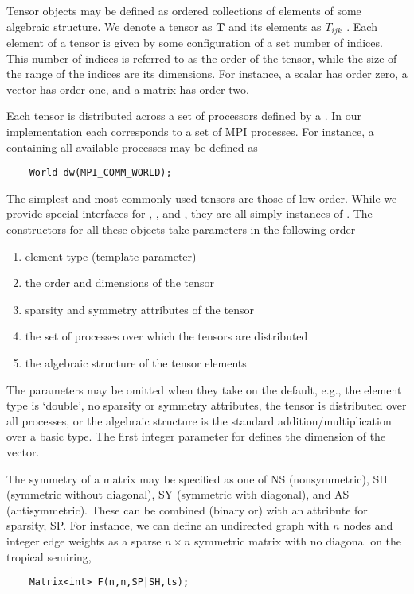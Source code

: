 Tensor objects may be defined as ordered collections of elements of some algebraic structure.
We denote a tensor as $\mathbf{T}$ and its elements as $T_{ijk..}$.
Each element of a tensor is given by some configuration of a set number of indices.
This number of indices is referred to as the order of the tensor, while the size of the range of the indices are its dimensions.
For instance, a scalar has order zero, a vector has order one, and a matrix has order two.

Each tensor is distributed across a set of processors defined by a {}.
In our implementation each {} corresponds to a set of MPI processes.
For instance, a {} containing all available processes may be defined as
\begin{lstlisting}
    World dw(MPI_COMM_WORLD);
\end{lstlisting}





The simplest and most commonly used tensors are those of low order.
While we provide special interfaces for {}, {}, and {}, they are all simply instances of {}.
The constructors for all these objects take parameters in the following order
\begin{enumerate}
\item element type (template parameter)
\item the order and dimensions of the tensor
\item sparsity and symmetry attributes of the tensor
\item the set of processes over which the tensors are distributed
\item the algebraic structure of the tensor elements
\end{enumerate}
The parameters may be omitted when they take on the default, e.g., the element type is `double', no sparsity or symmetry attributes, the tensor is distributed over all processes, or the algebraic structure is the standard addition/multiplication over a basic type.
The first integer parameter for {} defines the dimension of the vector.


The symmetry of a matrix may be specified as one of
NS (nonsymmetric), SH (symmetric without diagonal), SY (symmetric with diagonal), and AS (antisymmetric).
These can be combined (binary or) with an attribute for sparsity, SP.
For instance, we can define an undirected graph with $n$ nodes and integer edge weights as a sparse $n\times n$ symmetric matrix with no diagonal on the tropical semiring,
\begin{lstlisting}
    Matrix<int> F(n,n,SP|SH,ts);
\end{lstlisting}




